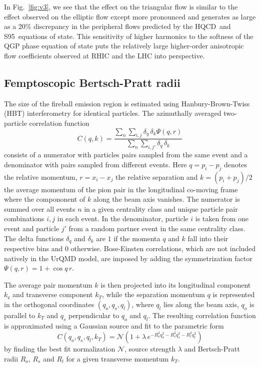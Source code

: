\documentclass[aps,prc,reprint,amsmath,nofootinbib,superscriptaddress]{revtex4-1}
\newcommand{\hotqcd}{HQCD~}
\newcommand{\spv}{S95~}
\begin{document}
In Fig.~\ref{fig:v3}, we see that the effect on the triangular flow is similar to the effect observed on the elliptic flow except more pronounced and generates as large as a $20\%$ discrepancy in the peripheral flows
predicted by the \hotqcd and \spv equations of state. This sensitivity of higher harmonics to the softness of the QGP phase equation of state puts the relatively large higher-order anisotropic flow coefficients observed at
RHIC and the LHC into perspective. 

\subsection{Femptoscopic Bertsch-Pratt radii}
\label{hbt}

The size of the fireball emission region is estimated using Hanbury-Brown-Twiss (HBT) interferometry for identical particles. The azimuthally averaged two-particle correlation function 
\begin{equation}
 \label{hbt}
 C(q, k) = \frac{\sum\limits_n \sum\limits_{i, j} \delta_{q} \, \delta_{k}\Psi(q,r)}{\sum\limits_{n} \sum\limits_{i,j'} \delta_{q} \, \delta_{k}}
\end{equation}
consists of a numerator with particles pairs sampled from the same event and a denominator with pairs sampled from different events. Here $q = p_i - p_j$ denotes the relative momentum, $r=x_i-x_j$ the relative separation and $k = (p_i + p_j)/2$ the average momentum of the pion pair in the longitudinal co-moving 
frame where the compononent of $k$ along the beam axis vanishes. The numerator is summed over all events $n$ in a given centrality class and unique particle pair combinations $i,j$ in each event. In the denominator, particle $i$ is
taken from one event and particle $j'$ from a random partner event in the same centrality class. The delta functions $\delta_q$ and $\delta_k$ are $1$ if the momenta $q$ and $k$ fall into their respective bins and $0$ otherwise. Bose-Einsten 
correlations, which are not included natively in the UrQMD model, are imposed by adding the symmetrization factor $\Psi(q,r) = 1 + \cos q\,r$. 

The average pair momentum $k$ is then projected into its longitudinal component $k_\text{z}$ and transverse component $k_T$, while the separation momentum $q$ is represented in the orthogonal coordinates 
$(q_o, q_s, q_l)$, where $q_l$ lies along the beam axis, $q_o$ is parallel to $k_T$ and $q_s$ perpendicular to $q_o$ and $q_l$. The resulting correlation function is approximated using a Gaussian source and 
fit to the parametric form
\begin{equation}
 \label{fitfunction}
 C(q_o, q_s, q_l, k_T) = \mathcal{N} \left(1 + \lambda\, e^{-R_o^2 q_o^2 - R_s^2 q_s^2 - R_l^2 q_l^2} \right) 
\end{equation}
by finding the best fit normalization $\mathcal{N}$, source strength $\lambda$ and Bertsch-Pratt radii $R_o$, $R_s$ and $R_l$ for a given transverse momentum $k_T$. 
\end{document}
